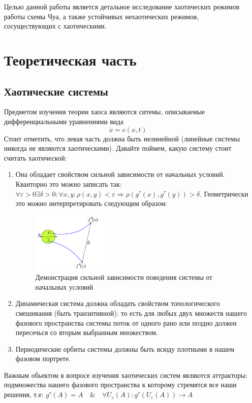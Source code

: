 \documentclass[12pt]{article}
\begin{document}
Целью данной работы является детальное исследование хаотических режимов работы схемы Чуа,
а также устойчивых нехаотических режимов, сосуществующих с хаотическими.

\section*{Теоретическая часть}
\subsection*{Хаотические системы}
Предметом изучения теории хаоса являются ситемы, описываемые дифференциальными уравнениями вида $$\dot{x} = v(x,t)$$
Стоит отметить, что левая часть должна быть нелинейной (линейные системы никогда не являются хаотическими). Давайте поймем, какую систему стоит считать хаотической:
\begin{enumerate}
	\item Она обладает свойством сильной зависимости от начальных условий. Кванторно это можно записать так: $\forall \varepsilon > 0 \exists \delta > 0: \forall x,y :  \rho(x,y) < \varepsilon \Rightarrow \rho(g^{\tau}(x),g^{\tau}(y)) > \delta$.
	      Геометрически это можно интерпретировать следующим образом:
	      \begin{figure}[H]
		      \centering
		      \includegraphics[width=0.35\textwidth]{dependance_st_pos.png}
		      \caption{Демонстрация сильной зависимости поведения системы от начальных условий}
		      \label{fig:demonstrate_dependance}
	      \end{figure}
	\item Динамическая система должна обладать свойством топологического смешивания (быть транзитивной): то есть для любых двух множеств нашего фазового пространства системы поток от одного рано или поздно должен пересечься со вторым выбранным множеством.
	\item Периодические орбиты системы должны быть всюду плотными в нашем фазовом портрете.
\end{enumerate}

Важным обьектом в вопросе изучения хаотических систем являются аттракторы: подмножества нашего фазового пространства к которому стремятся все наши решения, т.е:
$g^{\tau}(A) = A \quad\&\quad \forall U_{\varepsilon}(A): g^{\tau}(U_{\varepsilon}(A)) \rightarrow A$
\end{document}
